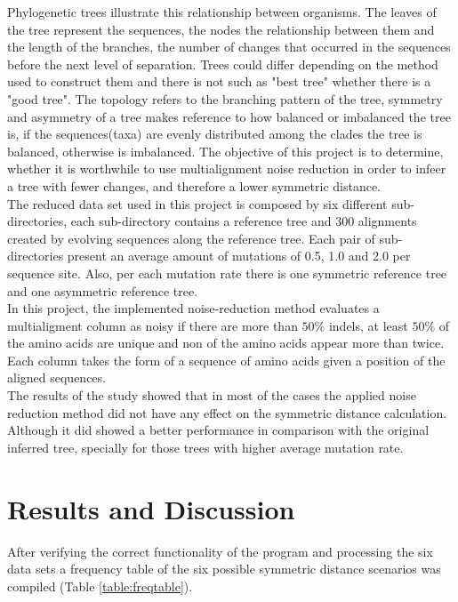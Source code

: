 \documentclass[12pt]{article}
\begin{document}
Phylogenetic trees illustrate this relationship between organisms. The leaves of the tree represent the sequences, the nodes the relationship between them and the length of the branches, the number of changes that occurred in the sequences before the next level of separation. Trees could differ depending on the method used to construct them and there is not such as "best tree" whether there is a "good tree". The topology refers to the branching pattern of the tree, symmetry and asymmetry of a tree makes reference to how balanced or imbalanced the tree is, if the sequences(taxa) are evenly distributed among the clades the tree is balanced, otherwise is imbalanced. The objective of this project is to determine, whether it is worthwhile to use multialignment noise reduction in order to infeer a tree with fewer changes, and therefore a lower symmetric distance.\\

The reduced data set used in this project is composed by six different sub-directories, each sub-directory contains a reference tree and 300 alignments created by evolving sequences along the reference tree. Each pair of sub-directories present an average amount of mutations of 0.5, 1.0 and 2.0 per sequence site. Also, per each mutation rate there is one symmetric reference tree and one asymmetric reference tree. \\

In this project, the implemented noise-reduction method evaluates a multialigment column as noisy if there are more than $50\%$ indels, at least $50\%$ of the amino acids are unique and non of the amino acids appear more than twice. Each column takes the form of a sequence of amino acids given a position of the aligned sequences. \\

The results of the study showed that in most of the cases the applied noise reduction method did not have any effect on the symmetric distance calculation. Although it did showed a better performance in comparison with the original inferred tree, specially for those trees with higher average mutation rate.


\section{Results and Discussion}
 
After verifying the correct functionality of the program and processing the six data sets a frequency table of the six possible symmetric distance scenarios was compiled (Table \ref{table:freqtable}).\\
\end{document}
